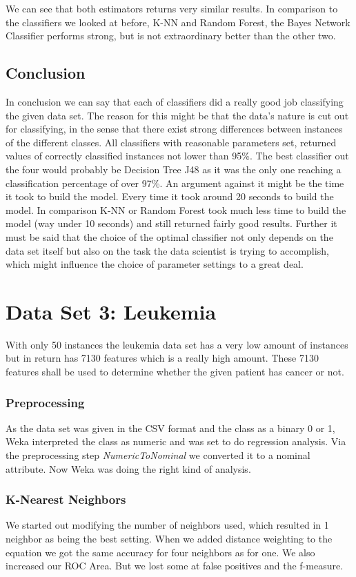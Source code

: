 \documentclass{article}
\begin{document}
We can see that both estimators returns very similar results. In comparison to the classifiers we looked at before, K-NN and Random Forest, the Bayes Network Classifier performs strong, but is not extraordinary better than the other two. 

\subsection{Conclusion}
In conclusion we can say that each of classifiers did a really good job classifying the given data set. The reason for this might be that the data's nature is cut out for classifying, in the sense that there exist strong differences between instances of the different classes. All classifiers with reasonable parameters set, returned values of correctly classified instances not lower than 95\%. The best classifier out the four would probably be Decision Tree J48 as it was the only one reaching a classification percentage of over 97\%. An argument against it might be the time it took to build the model. Every time it took around 20 seconds to build the model. In comparison K-NN or Random Forest took much less time to build the model (way under 10 seconds) and still returned fairly good results. Further it must be said that the choice of the optimal classifier not only depends on the data set itself but also on the task the data scientist is trying to accomplish, which might influence the choice of parameter settings to a great deal.   

\section{Data Set 3: Leukemia}
With only 50 instances the leukemia data set has a very low amount of instances but in return has 7130 features which is a really high amount. These 7130 features shall be used to determine whether the given patient has cancer or not.  \\
\subsubsection{Preprocessing}
As the data set was given in the CSV format and the class as a binary 0 or 1, Weka interpreted the class as numeric and was set to do regression analysis. Via the preprocessing step \emph{NumericToNominal} we converted it to a nominal attribute. Now Weka was doing the right kind of analysis.
\subsubsection{K-Nearest Neighbors}
We started out modifying the number of neighbors used, which resulted in 1 neighbor as being the best setting. When we added distance weighting to the equation we got the same accuracy for four neighbors as for one. We also increased our ROC Area.  But we lost some at false positives and the f-measure. \\
\end{document}
